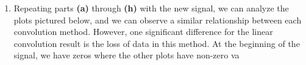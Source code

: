 \documentclass[12pt]{article}
\begin{document}
\begin{enumerate}[label=\textbf{\alph*)}, leftmargin=2.6em]
\item Repeating parts \textbf{(a)} through \textbf{(h)} with the new signal, we can analyze the plots pictured below, and we can observe a similar relationship between each convolution method. However, one significant difference for the linear convolution result is the loss of data in this method. At the beginning of the signal, we have zeros where the other plots have non-zero va
\end{enumerate}
\end{document}
